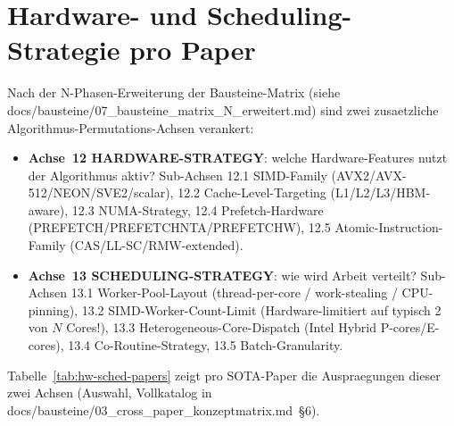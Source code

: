 \section{Hardware- und Scheduling-Strategie pro Paper}\label{sec:hw-sched-pro-paper}


Nach der N-Phasen-Erweiterung der Bausteine-Matrix (siehe
docs/bausteine/07\_bausteine\_matrix\_N\_erweitert.md) sind zwei
zusaetzliche Algorithmus-Permutations-Achsen verankert:

\begin{itemize}
    \item \textbf{Achse~12 HARDWARE-STRATEGY}: welche Hardware-Features
    nutzt der Algorithmus aktiv? Sub-Achsen 12.1 SIMD-Family
    (AVX2/AVX-512/NEON/SVE2/scalar), 12.2 Cache-Level-Targeting
    (L1/L2/L3/HBM-aware), 12.3 NUMA-Strategy, 12.4 Prefetch-Hardware
    (PREFETCH/PREFETCHNTA/PREFETCHW), 12.5 Atomic-Instruction-Family
    (CAS/LL-SC/RMW-extended).

    \item \textbf{Achse~13 SCHEDULING-STRATEGY}: wie wird Arbeit
    verteilt? Sub-Achsen 13.1 Worker-Pool-Layout (thread-per-core /
    work-stealing / CPU-pinning), 13.2 SIMD-Worker-Count-Limit
    (Hardware-limitiert auf typisch 2 von $N$ Cores!),
    13.3 Heterogeneous-Core-Dispatch (Intel Hybrid P-cores/E-cores),
    13.4 Co-Routine-Strategy, 13.5 Batch-Granularity.
\end{itemize}

Tabelle~\ref{tab:hw-sched-papers} zeigt pro SOTA-Paper die
Auspraegungen dieser zwei Achsen (Auswahl, Vollkatalog in
docs/bausteine/03\_cross\_paper\_konzeptmatrix.md~\S{}6).

